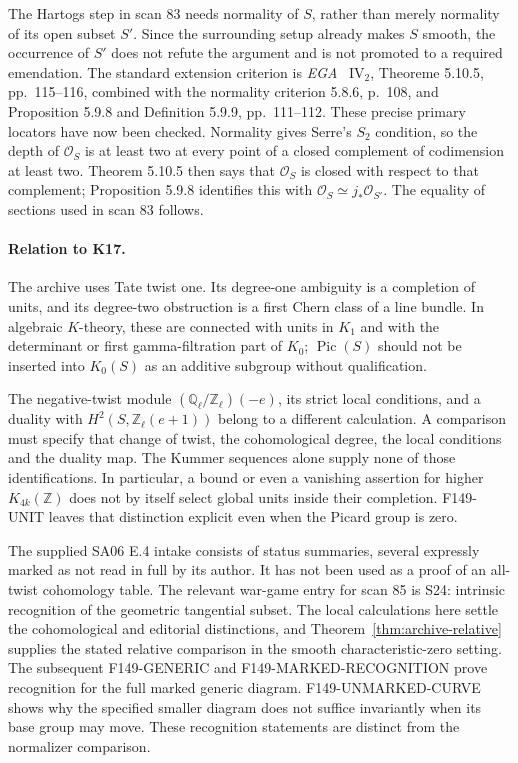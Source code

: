 The Hartogs step in scan 83 needs normality of \(S\), rather than
merely normality of its open subset \(S'\).  Since the surrounding
setup already makes \(S\) smooth, the occurrence of \(S'\) does not
refute the argument and is not promoted to a required emendation.
The standard extension criterion is \emph{EGA}~\cite{EGAIV2}
\(\mathrm{IV}_2\), Theoreme 5.10.5, pp.~115--116, combined with
the normality criterion 5.8.6, p.~108, and Proposition 5.9.8 and
Definition 5.9.9, pp.~111--112.  These precise primary locators have
now been checked.  Normality gives Serre's \(S_2\) condition, so
the depth of \(\mathcal O_S\) is at least two at every point of a
closed complement of codimension at least two.  Theorem 5.10.5
then says that \(\mathcal O_S\) is closed with respect to that
complement; Proposition 5.9.8 identifies this with
\(\mathcal O_S\simeq j_*\mathcal O_{S'}\).
The equality of sections used in scan 83 follows.

\paragraph{Relation to K17.}
The archive uses Tate twist one.  Its degree-one ambiguity is a
completion of units, and its degree-two obstruction is a first Chern
class of a line bundle.  In algebraic \(K\)-theory, these are connected
with units in \(K_1\) and with the determinant or first
gamma-filtration part of \(K_0\); \(\operatorname{Pic}(S)\) should
not be inserted into \(K_0(S)\) as an additive subgroup without
qualification.

The negative-twist module
\((\mathbb Q_\ell/\mathbb Z_\ell)(-e)\), its strict local conditions,
and a duality with \(H^2(S,\mathbb Z_\ell(e+1))\) belong to a
different calculation.  A comparison must specify that change of
twist, the cohomological degree, the local conditions and the duality
map.  The Kummer sequences alone supply none of those identifications.
In particular, a bound or even a vanishing assertion for higher
\(K_{4k}(\mathbb Z)\) does not by itself select global units inside
their completion.  F149-UNIT leaves that distinction explicit even
when the Picard group is zero.

The supplied SA06 E.4 intake consists of status summaries, several
expressly marked as not read in full by its author.  It has not been
used as a proof of an all-twist cohomology table.  The relevant
war-game entry for scan 85 is S24: intrinsic recognition of the
geometric tangential subset.  The local calculations here settle the
cohomological and editorial distinctions, and Theorem~\ref{thm:archive-relative} supplies the stated relative comparison in the smooth characteristic-zero setting. The subsequent F149-GENERIC and F149-MARKED-RECOGNITION prove recognition for the full marked generic diagram. F149-UNMARKED-CURVE shows why the specified smaller diagram does not suffice invariantly when its base group may move. These recognition statements are distinct from the normalizer comparison.
